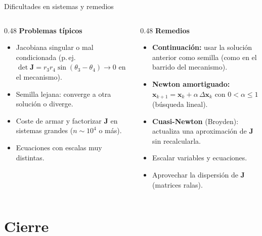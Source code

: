 \documentclass[aspectratio=169,11pt]{beamer}
\newcommand{\vect}[1]{\mathbf{#1}}
\newcommand{\Jac}{\mathbf{J}}
\begin{document}
\begin{frame}{Dificultades en sistemas y remedios}
  \begin{columns}[T]
    \begin{column}{0.48\textwidth}
      \textbf{Problemas típicos}
      \begin{itemize}
        \item \alert{Jacobiana singular} o mal condicionada (p.\,ej.\ $\det\Jac=r_3r_4\sin(\theta_3-\theta_4)\to0$ en el mecanismo).
        \item Semilla lejana: converge a otra solución o diverge.
        \item Coste de armar y factorizar $\Jac$ en sistemas grandes ($n\sim10^4$ o más).
        \item Ecuaciones con escalas muy distintas.
      \end{itemize}
    \end{column}
    \begin{column}{0.48\textwidth}
      \textbf{Remedios}
      \begin{itemize}
        \item \textbf{Continuación:} usar la solución anterior como semilla (como en el barrido del mecanismo).
        \item \textbf{Newton amortiguado:} $\vect x_{k+1}=\vect x_k+\alpha\,\Delta\vect x_k$ con $0<\alpha\le1$ (búsqueda lineal).
        \item \textbf{Cuasi-Newton} (Broyden): actualiza una aproximación de $\Jac$ sin recalcularla.
        \item Escalar variables y ecuaciones.
        \item Aprovechar la \alert{dispersión} de $\Jac$ (matrices ralas).
      \end{itemize}
    \end{column}
  \end{columns}
\end{frame}

\section{Cierre}
\end{document}
